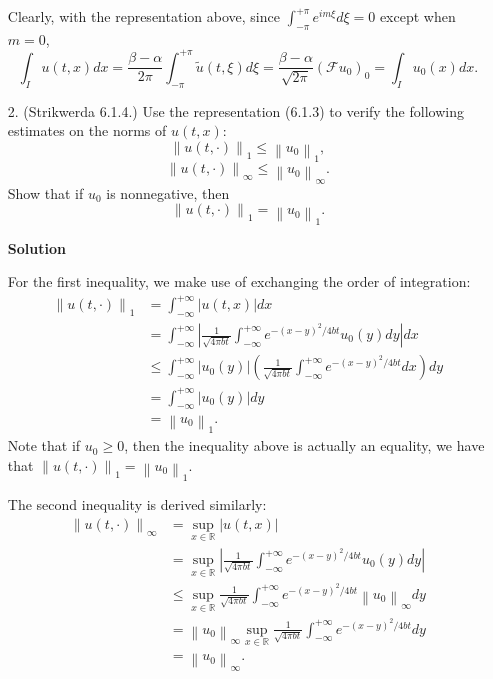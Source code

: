 \documentclass{article}
\providecommand{\abs}[1]{\left\lvert#1\right\rvert}
\providecommand{\norm}[1]{\left\lVert#1\right\rVert}
\begin{document}
\begin{itemize}
Clearly, with the representation above, since $\int_{-\pi}^{+\pi} e^{im\xi} d\xi = 0$ except when $m = 0$,
\begin{equation*}
\int_I u(t,x) dx = \frac{\beta - \alpha}{2\pi} \int_{-\pi}^{+\pi} \tilde{u}(t,\xi) d\xi = \frac{\beta - \alpha}{\sqrt{2\pi}} \left( \mathcal{F} u_0 \right)_0 = \int_I u_0(x) dx.
\end{equation*}

\item[2.] (Strikwerda 6.1.4.) Use the representation (6.1.3) to verify the following estimates on the norms of $u(t,x)$:
\begin{equation*}
\norm{u(t,\cdot)}_1 \leq \norm{u_0}_1,
\end{equation*}
\begin{equation*}
\norm{u(t,\cdot)}_{\infty} \leq \norm{u_0}_{\infty}.
\end{equation*}
Show that if $u_0$ is nonnegative, then
\begin{equation*}
\norm{u(t,\cdot)}_1 = \norm{u_0}_1.
\end{equation*}

\textbf{Solution}

For the first inequality, we make use of exchanging the order of integration:
\begin{align*}
\norm{u(t,\cdot)}_1
 & = \int_{-\infty}^{+\infty} \abs{u(t,x)} dx \\
 & = \int_{-\infty}^{+\infty} \abs{\frac{1}{\sqrt{4\pi bt}} \int_{-\infty}^{+\infty} e^{-(x-y)^2/4bt} u_0(y) dy} dx \\
 & \leq \int_{-\infty}^{+\infty} \abs{u_0(y)} \left( \frac{1}{\sqrt{4\pi bt}} \int_{-\infty}^{+\infty} e^{-(x-y)^2/4bt} dx \right) dy \\
 & = \int_{-\infty}^{+\infty} \abs{u_0(y)} dy \\
 & = \norm{u_0}_1.
\end{align*}
Note that if $u_0 \geq 0$, then the inequality above is actually an equality, we have that $\norm{u(t,\cdot)}_1 = \norm{u_0}_1$.

The second inequality is derived similarly:
\begin{align*}
\norm{u(t,\cdot)}_{\infty}
 & = \sup_{x \in \mathbb{R}} \abs{u(t,x)} \\
 & = \sup_{x \in \mathbb{R}} \abs{\frac{1}{\sqrt{4\pi bt}} \int_{-\infty}^{+\infty} e^{-(x-y)^2/4bt} u_0(y) dy} \\
 & \leq \sup_{x \in \mathbb{R}} \frac{1}{\sqrt{4\pi bt}} \int_{-\infty}^{+\infty} e^{-(x-y)^2/4bt} \norm{u_0}_{\infty} dy \\
 & = \norm{u_0}_{\infty} \sup_{x \in \mathbb{R}} \frac{1}{\sqrt{4\pi bt}} \int_{-\infty}^{+\infty} e^{-(x-y)^2/4bt} dy \\
 & = \norm{u_0}_{\infty}.
\end{align*}


\end{itemize}
\end{document}
